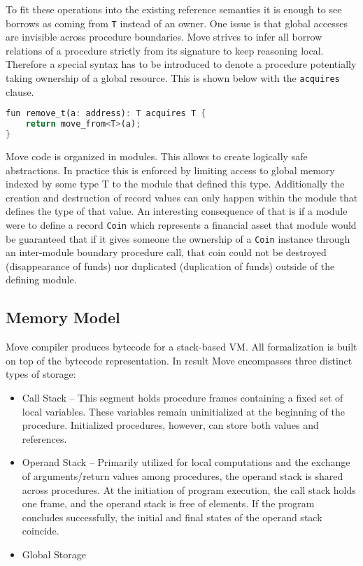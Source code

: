 To fit these operations into the existing reference semantics it is enough to see borrows as coming from \lstinline{T} instead of an owner. One issue is that global accesses are invisible across procedure boundaries. Move strives to infer all borrow relations of a procedure strictly from its signature to keep reasoning local. Therefore a special syntax has to be introduced to denote a procedure potentially taking ownership of a global resource. This is shown below with the \lstinline{acquires} clause.


\begin{lstlisting}[escapechar=!, language=Rust]
fun remove_t(a: address): T acquires T {
    return move_from<T>(a);
}
\end{lstlisting}

Move code is organized in modules. This allows to create logically safe abstractions. In practice this is enforced by limiting access to global memory indexed by some type T to the module that defined this type. Additionally the creation and destruction of record values can only happen within the module that defines the type of that value. An interesting consequence of that is if a module were to define a record \lstinline{Coin} which represents a financial asset that module would be guaranteed that if it gives someone the ownership of a \lstinline{Coin} instance through an inter-module boundary procedure call, that coin could not be destroyed (disappearance of funds) nor duplicated (duplication of funds) outside of the defining module.


\subsection{Memory Model}

Move compiler produces bytecode for a stack-based VM. All formalization is built on top of the bytecode representation. In result Move encompasses three distinct types of storage:

\begin{itemize}
    \item Call Stack -- This segment holds procedure frames containing a fixed set of local variables. These variables remain uninitialized at the beginning of the procedure. Initialized procedures, however, can store both values and references.
    \item Operand Stack -- Primarily utilized for local computations and the exchange of arguments/return values among procedures, the operand stack is shared across procedures. At the initiation of program execution, the call stack holds one frame, and the operand stack is free of elements. If the program concludes successfully, the initial and final states of the operand stack coincide.
    \item Global Storage
\end{itemize}

